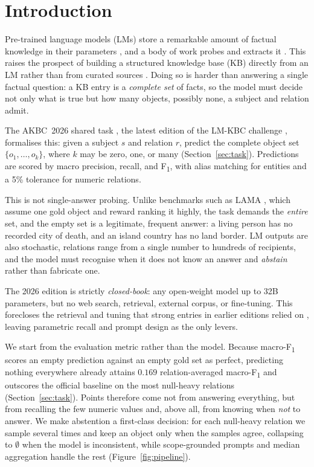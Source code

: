 \section{Introduction}
Pre-trained language models (LMs) store a remarkable amount of factual knowledge
in their parameters \citep{petroni2019lama,roberts2020closedbook}, and a body of
work probes and extracts it \citep{jiang2020lpaqa,zhong2021optiprompt,alkhamissi2022review}.
This raises the prospect of building a structured knowledge base (KB) directly
from an LM rather than from curated sources \citep{dong2014knowledgevault,vrandecic2014wikidata}.
Doing so is harder than answering a single factual question: a KB entry is a
\emph{complete set} of facts, so the model must decide not only what is true but
how many objects, possibly none, a subject and relation admit.

The AKBC~2026 shared task \citep{kalo2026akbc}, the latest edition of the LM-KBC
challenge \citep{alivanistos2022prompting,kalo2023lmkbc,kalo2025lmkbc},
formalises this: given a subject $s$ and relation $r$, predict the complete object
set $\{o_1,\dots,o_k\}$, where $k$ may be zero, one, or many (Section~\ref{sec:task}).
Predictions are scored by macro precision, recall, and F\textsubscript{1}, with
alias matching for entities and a 5\% tolerance for numeric relations.

This is not single-answer probing. Unlike benchmarks such as LAMA
\citep{petroni2019lama}, which assume one gold object and reward ranking it highly,
the task demands the \emph{entire} set, and the empty set is a legitimate, frequent
answer: a living person has no recorded city of death, and an island country has no
land border. LM outputs are also stochastic, relations range from a single number
to hundreds of recipients, and the model must recognise when it does not know an
answer and \emph{abstain} rather than fabricate one.

The 2026 edition is strictly \emph{closed-book}: any open-weight model up to 32B
parameters, but no web search, retrieval, external corpus, or fine-tuning. This
forecloses the retrieval and tuning that strong entries in earlier editions relied
on \citep{zhang2023llmke,asai2024selfrag}, leaving parametric recall and prompt
design as the only levers.

We start from the evaluation metric rather than the model. Because
macro-F\textsubscript{1} scores an empty prediction against an empty gold set as
perfect, predicting nothing everywhere already attains $0.169$ relation-averaged
macro-F\textsubscript{1} and outscores the official baseline on the most null-heavy
relations (Section~\ref{sec:task}). Points therefore
come not from answering everything, but from recalling the few numeric values and,
above all, from knowing when \emph{not} to answer. We make abstention a first-class
decision: for each null-heavy relation we sample several times and keep an object
only when the samples agree, collapsing to $\emptyset$ when the model is
inconsistent, while scope-grounded prompts and median aggregation handle the rest
(Figure~\ref{fig:pipeline}).

